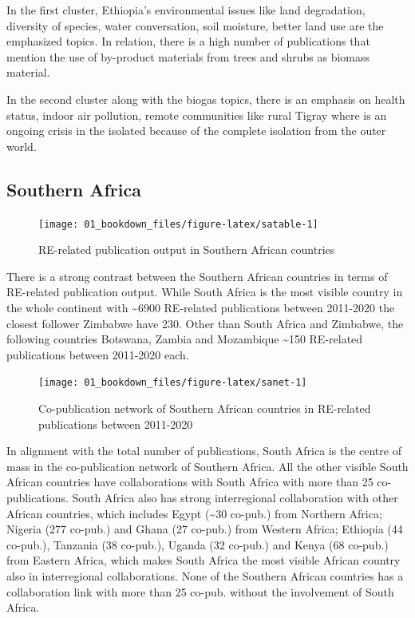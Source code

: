 \documentclass[
]{book}
\begin{document}
In the first cluster, Ethiopia's environmental issues like land degradation, diversity of species, water conversation, soil moisture, better land use are the emphasized topics. In relation, there is a high number of publications that mention the use of by-product materials from trees and shrubs as biomass material.

In the second cluster along with the biogas topics, there is an emphasis on health status, indoor air pollution, remote communities like rural Tigray where is an ongoing crisis in the isolated because of the complete isolation from the outer world.

\hypertarget{southern-africa}{%
\subsection{Southern Africa}\label{southern-africa}}

\begin{figure}
\texttt{[image: 01\_bookdown\_files/figure-latex/satable-1]} \caption{RE-related publication output in Southern African countries}\label{fig:satable}
\end{figure}

There is a strong contrast between the Southern African countries in terms of RE-related publication output. While South Africa is the most visible country in the whole continent with \textasciitilde6900 RE-related publications between 2011-2020 the closest follower Zimbabwe have 230. Other than South Africa and Zimbabwe, the following countries Botswana, Zambia and Mozambique \textasciitilde150 RE-related publications between 2011-2020 each.

\begin{figure}
\texttt{[image: 01\_bookdown\_files/figure-latex/sanet-1]} \caption{Co-publication network of Southern African countries in RE-related publications between 2011-2020}\label{fig:sanet}
\end{figure}

In alignment with the total number of publications, South Africa is the centre of mass in the co-publication network of Southern Africa. All the other visible South African countries have collaborations with South Africa with more than 25 co-publications. South Africa also has strong interregional collaboration with other African countries, which includes Egypt (\textasciitilde30 co-pub.) from Northern Africa; Nigeria (277 co-pub.) and Ghana (27 co-pub.) from Western Africa; Ethiopia (44 co-pub.), Tanzania (38 co-pub.), Uganda (32 co-pub.) and Kenya (68 co-pub.) from Eastern Africa, which makes South Africa the most visible African country also in interregional collaborations. None of the Southern African countries has a collaboration link with more than 25 co-pub. without the involvement of South Africa.
\end{document}
